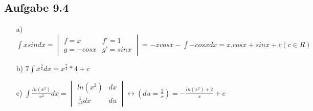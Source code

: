 \documentclass{standalone}
\begin{document}
\subsection{Aufgabe 9.4}
\begin{itemize}
		\item[a)]$\int xsin dx=
		\begin{vmatrix}
		f=x&f'=1  \\
		g=-cosx & g'=sinx 
		\end{vmatrix}
		=-xcosx-\int -cosxdx = x.cosx+sinx+c(c \in R)$
		\item[b)]$7 \int x^\frac{3}{4} dx=x^\frac{7}{4}*4+c$
		\item[c)]$\int \frac{ln(x^2)}{x^2} dx=\begin{vmatrix}
		ln(x^2) & dx \\
		\frac{1}{x^2}dx& du 
		\end{vmatrix} \leftrightarrow(du=\frac{2}{x})= -\frac{ln(x^2)+2}{x}+c$	
\end{itemize}
\end{document}
